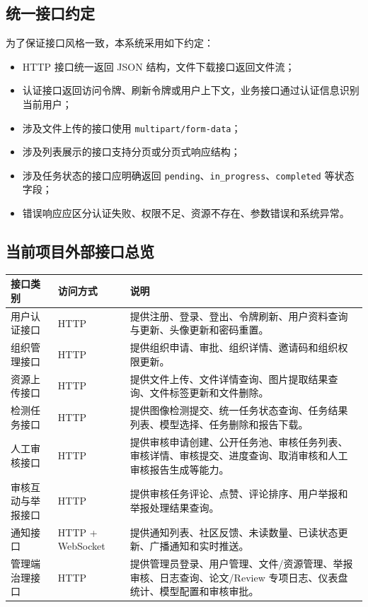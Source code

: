 \subsection{统一接口约定}
为了保证接口风格一致，本系统采用如下约定：
\begin{itemize}[leftmargin=2em]
    \item HTTP 接口统一返回 JSON 结构，文件下载接口返回文件流；
    \item 认证接口返回访问令牌、刷新令牌或用户上下文，业务接口通过认证信息识别当前用户；
    \item 涉及文件上传的接口使用 \texttt{multipart/form-data}；
    \item 涉及列表展示的接口支持分页或分页式响应结构；
    \item 涉及任务状态的接口应明确返回 \texttt{pending}、\texttt{in\_progress}、\texttt{completed} 等状态字段；
    \item 错误响应应区分认证失败、权限不足、资源不存在、参数错误和系统异常。
\end{itemize}

\subsection{当前项目外部接口总览}
\begin{longtable}{|p{3.2cm}|p{2cm}|p{8.6cm}|}
\hline
接口类别 & 访问方式 & 说明 \\ \hline
用户认证接口 & HTTP & 提供注册、登录、登出、令牌刷新、用户资料查询与更新、头像更新和密码重置。 \\ \hline
组织管理接口 & HTTP & 提供组织申请、审批、组织详情、邀请码和组织权限更新。 \\ \hline
资源上传接口 & HTTP & 提供文件上传、文件详情查询、图片提取结果查询、文件标签更新和文件删除。 \\ \hline
检测任务接口 & HTTP & 提供图像检测提交、统一任务状态查询、任务结果列表、模型选择、任务删除和报告下载。 \\ \hline
人工审核接口 & HTTP & 提供审核申请创建、公开任务池、审核任务列表、审核详情、审核提交、进度查询、取消审核和人工审核报告生成等能力。 \\ \hline
审核互动与举报接口 & HTTP & 提供审核任务评论、点赞、评论排序、用户举报和举报处理结果查询。 \\ \hline
通知接口 & HTTP + WebSocket & 提供通知列表、社区反馈、未读数量、已读状态更新、广播通知和实时推送。 \\ \hline
管理端治理接口 & HTTP & 提供管理员登录、用户管理、文件/资源管理、举报审核、日志查询、论文/Review 专项日志、仪表盘统计、模型配置和审核审批。 \\ \hline
\end{longtable}

